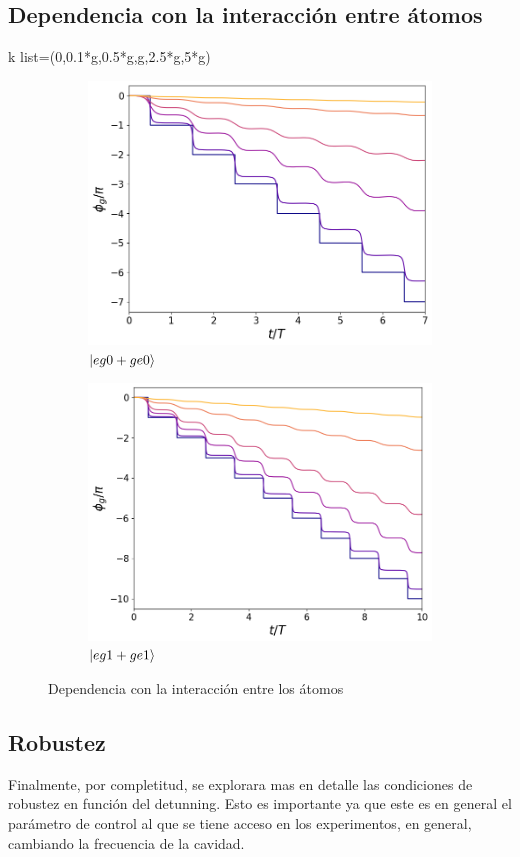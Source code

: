\subsection{Dependencia con la interacción entre átomos}
k list=(0,0.1*g,0.5*g,g,2.5*g,5*g)


\begin{figure}[h]
    \centering
    \begin{subfigure}{0.49\textwidth}
        \includegraphics[width=\textwidth]{figuras/ch5/dependencia/eg0+/interaccion todo 0.png}
        \caption{$\ket{eg0+ge0}$}
        \label{fig5:dependencia interaccion eg0}
    \end{subfigure}
    \hfill
    \begin{subfigure}{0.49\textwidth}
        \includegraphics[width=\textwidth]{figuras/ch5/dependencia/eg1+/interaccion todo 0.png}
        \caption{$\ket{eg1+ge1}$}
        \label{fig5:dependencia interaccion eg1}
    \end{subfigure}
    \caption{Dependencia con la interacción entre los átomos}
    \label{fig5:dependencia interaccion}
\end{figure}
\subsection{Robustez}
Finalmente, por completitud, se explorara mas en detalle las condiciones de robustez en función del detunning. Esto es importante ya que este es en general el parámetro de control al que se tiene acceso en los experimentos, en general, cambiando la frecuencia de la cavidad.


